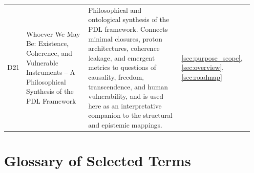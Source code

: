 \documentclass[11pt,a4paper]{article}
\begin{document}
\begin{longtable}{@{}p{0.9cm}L{5cm}L{6.5cm}L{2.4cm}@{}}
  D21 & 
  Whoever We May Be: Existence, Coherence, and Vulnerable Instruments -- A Philosophical Synthesis of the PDL Framework & 
  Philosophical and ontological synthesis of the PDL framework.\citep{WhoeverWeMayBe2026} Connects minimal closures, proton architectures, coherence leakage, and emergent metrics to questions of causality, freedom, transcendence, and human vulnerability, and is used here as an interpretative companion to the structural and epistemic mappings. & 
  \ref{sec:purpose_scope}, \ref{sec:overview}, \ref{sec:roadmap} \\[0.4em]


\end{longtable}

\section{Glossary of Selected Terms}
\label{app:glossary}
\end{document}
